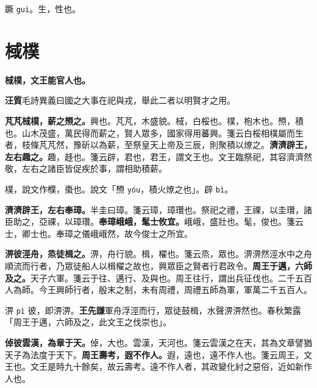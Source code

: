\begin{quoting}蹶 \texttt{guì}。生，性也。\end{quoting}

\section{棫樸}


\textbf{棫樸，文王能官人也。}

\begin{quoting}\textbf{汪質}毛詩異義曰國之大事在祀與戎，舉此二者以明賢才之用。\end{quoting}

\textbf{芃芃棫樸，薪之槱之。}{\footnotesize 興也。芃芃，木盛貌。棫，白桵也。樸，枹木也。槱，積也。山木茂盛，萬民得而薪之，賢人眾多，國家得用蕃興。箋云白桵相樸屬而生者，枝條芃芃然，豫斫以為薪，至祭皇天上帝及三辰，則聚積以燎之。}\textbf{濟濟辟王，左右趣之。}{\footnotesize 趣，趍也。箋云辟，君也，君王，謂文王也。文王臨祭祀，其容濟濟然敬，左右之諸臣皆促疾於事，謂相助積薪。}

\begin{quoting}樸，說文作㯷，棗也。說文「槱 \texttt{yóu}，積火燎之也」。辟 \texttt{bì}。\end{quoting}

\textbf{濟濟辟王，左右奉璋。}{\footnotesize 半圭曰璋。箋云璋，璋瓚也。祭祀之禮，王祼，以圭瓚，諸臣助之，亞祼，以璋瓚。}\textbf{奉璋峨峨，髦士攸宜。}{\footnotesize 峨峨，盛壯也。髦，俊也。箋云士，卿士也。奉璋之儀峨峨然，故今俊士之所宜。}

\textbf{淠彼涇舟，烝徒楫之。}{\footnotesize 淠，舟行貌。楫，櫂也。箋云烝，眾也。淠淠然涇水中之舟順流而行者，乃眾徒船人以楫櫂之故也，興眾臣之賢者行君政令。}\textbf{周王于邁，六師及之。}{\footnotesize 天子六軍。箋云于往、邁行、及與也。周王往行，謂出兵征伐也。二千五百人為師。今王興師行者，殷末之制，未有周禮，周禮五師為軍，軍萬二千五百人。}

\begin{quoting}淠 \texttt{pì} 彼，即淠淠。\textbf{王先謙}軍舟浮涇而行，眾徒鼓楫，水聲淠淠然也。春秋繁露「周王于邁，六師及之，此文王之伐崇也」。\end{quoting}

\textbf{倬彼雲漢，為章于天。}{\footnotesize 倬，大也。雲漢，天河也。箋云雲漢之在天，其為文章譬猶天子為法度于天下。}\textbf{周王壽考，遐不作人。}{\footnotesize 遐，遠也，遠不作人也。箋云周王，文王也。文王是時九十餘矣，故云壽考。遠不作人者，其政變化紂之惡俗，近如新作人也。}

